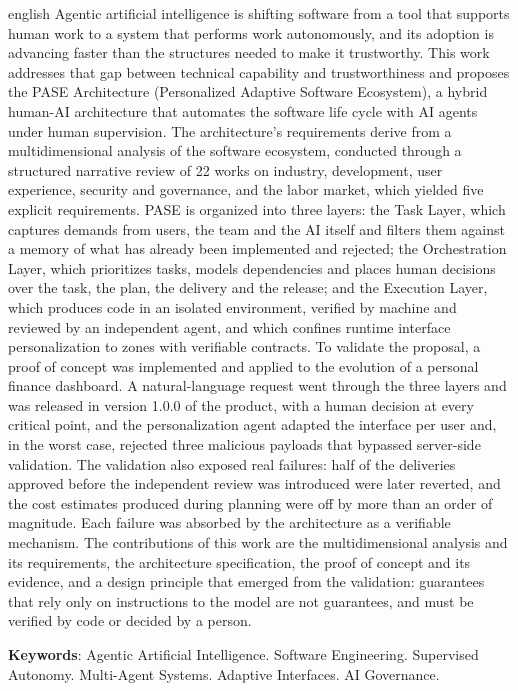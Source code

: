 \begin{resumo}[Abstract]
 \begin{otherlanguage*}{english}
Agentic artificial intelligence is shifting software from a tool that supports human work to a system that performs work autonomously, and its adoption is advancing faster than the structures needed to make it trustworthy. This work addresses that gap between technical capability and trustworthiness and proposes the PASE Architecture (Personalized Adaptive Software Ecosystem), a hybrid human-AI architecture that automates the software life cycle with AI agents under human supervision. The architecture's requirements derive from a multidimensional analysis of the software ecosystem, conducted through a structured narrative review of 22 works on industry, development, user experience, security and governance, and the labor market, which yielded five explicit requirements. PASE is organized into three layers: the Task Layer, which captures demands from users, the team and the AI itself and filters them against a memory of what has already been implemented and rejected; the Orchestration Layer, which prioritizes tasks, models dependencies and places human decisions over the task, the plan, the delivery and the release; and the Execution Layer, which produces code in an isolated environment, verified by machine and reviewed by an independent agent, and which confines runtime interface personalization to zones with verifiable contracts. To validate the proposal, a proof of concept was implemented and applied to the evolution of a personal finance dashboard. A natural-language request went through the three layers and was released in version 1.0.0 of the product, with a human decision at every critical point, and the personalization agent adapted the interface per user and, in the worst case, rejected three malicious payloads that bypassed server-side validation. The validation also exposed real failures: half of the deliveries approved before the independent review was introduced were later reverted, and the cost estimates produced during planning were off by more than an order of magnitude. Each failure was absorbed by the architecture as a verifiable mechanism. The contributions of this work are the multidimensional analysis and its requirements, the architecture specification, the proof of concept and its evidence, and a design principle that emerged from the validation: guarantees that rely only on instructions to the model are not guarantees, and must be verified by code or decided by a person.

   \vspace{\onelineskip}

   \noindent
   \textbf{Keywords}: Agentic Artificial Intelligence. Software Engineering. Supervised Autonomy. Multi-Agent Systems. Adaptive Interfaces. AI Governance.
 \end{otherlanguage*}
\end{resumo}
